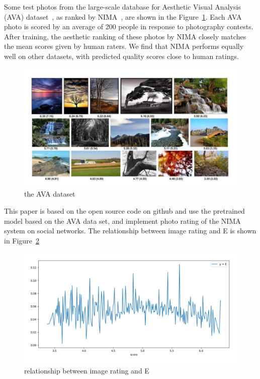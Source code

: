 \documentclass[10pt,twocolumn,letterpaper]{article}
\begin{document}
    Some test photos from the large-scale database for Aesthetic Visual Analysis (AVA) dataset~\cite{Murray12}, as ranked by NIMA~\cite{Talebi18}, are shown in the Figure~\ref{fig:331}.
    Each AVA photo is scored by an average of 200 people in response to photography contests.
    After training, the aesthetic ranking of these photos by NIMA closely matches the mean scores given by human raters.
    We find that NIMA performs equally well on other datasets, with predicted quality scores close to human ratings.
    \begin{figure}[t]
    \begin{center}
    \includegraphics[width=\linewidth]{331}
    \end{center}
    \vspace{-0.5cm}
       \caption{the AVA dataset}
       \label{fig:331}
    \end{figure}
    This paper is based on the open source code on github and use the pretrained model based on the AVA data set, and implement photo rating of the NIMA system on social networks.
    The relationship between image rating and E is shown in Figure~\ref{fig:e1}
    \begin{figure}[t]
    \begin{center}
    \includegraphics[width=\linewidth]{e1}
    \end{center}
    \vspace{-0.5cm}
       \caption{relationship between image rating and E}
       \label{fig:e1}
    \end{figure}
\end{document}
